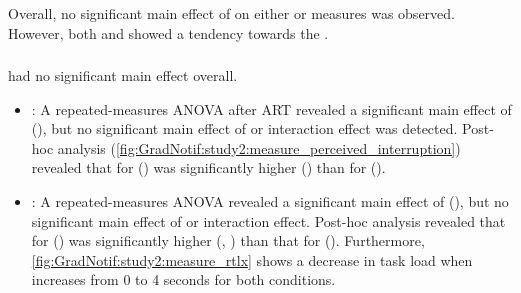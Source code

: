 Overall, no significant main effect of \animation{} on either \Interruption{} or \Reaction{} measures was observed. However, both \Comprehension{} and \Satisfaction{} showed a tendency towards the \fading{} \animation{}.

\subsubsection*{\Interruption{}}
\Animation{} had no significant main effect overall. 

\begin{itemize}
    \item \perceivedInterruption{}: A repeated-measures ANOVA after ART revealed a significant main effect of \mobility{} (), but no significant main effect of \animation{} or interaction effect was detected. Post-hoc analysis (\autoref{fig:GradNotif:study2:measure_perceived_interruption}) revealed that \perceivedInterruption{} for \walking{} () was significantly higher () than for \sitting{} ().
    \item \perceivedTaskLoad{}: A repeated-measures ANOVA revealed a significant main effect of \mobility{} (), but no significant main effect of \animation{} or interaction effect. Post-hoc analysis revealed that \perceivedInterruption{} for \walking{} () was significantly higher (, ) than that for \sitting{} (). Furthermore, \autoref{fig:GradNotif:study2:measure_rtlx} shows a decrease in task load when \fadeduration{} increases from 0 to 4 seconds for both \mobility{} conditions.
\end{itemize}


